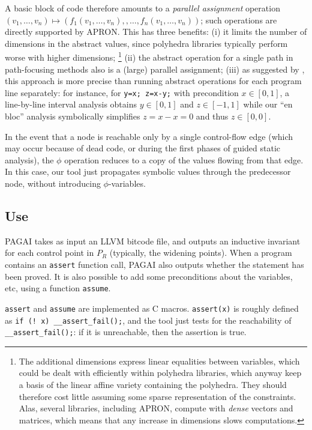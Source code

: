 \documentclass{entcs}
\begin{document}
A basic block of code therefore amounts to a \emph{parallel assignment} operation
$(v_1,\dots,v_n) \allowbreak\mapsto\allowbreak
(f_1(v_1,\dots,v_n), \allowbreak, \dots, \allowbreak
 f_n(v_1,\dots,v_n))$;
such operations are directly supported by APRON. This has three benefits:
(i) it limits the number of dimensions in the abstract values, since polyhedra libraries typically perform worse with higher dimensions;%
\footnote{The additional dimensions express linear equalities between variables, which could be dealt with efficiently within polyhedra libraries, which anyway keep a basis of the linear affine variety containing the polyhedra.
They should therefore cost little assuming some sparse representation of the constraints.
Alas, several libraries, including APRON, compute with \emph{dense} vectors and matrices, which means that any increase in dimensions slows computations.}
(ii) the abstract operation for a single path in path-focusing methods also is a (large) parallel assignment;
(iii) as suggested by \citet{DBLP:conf/vmcai/Mine06}, this approach is more precise than running abstract operations for each program line separately:
for instance, for \lstinline|y=x; z=x-y;| with precondition $x \in [0,1]$, a line-by-line interval analysis obtains $y \in [0,1]$ and $z \in [-1,1]$ while our ``en bloc'' analysis symbolically simplifies $z = x - x = 0$ and thus $z \in [0,0]$.

In the event that a node is reachable only by a single control-flow edge (which may occur because of dead code, or during the first phases of guided static analysis), the $\phi$ operation reduces to a copy of the values flowing from that edge. In this case, our tool just propagates symbolic values through the predecessor node, without introducing $\phi$-variables.


\subsection{Use}

PAGAI takes as input an LLVM bitcode file, and outputs an inductive invariant
for each control point in $P_R$ (typically, the widening points).
When a program contains an \lstinline|assert| function call, PAGAI also outputs whether
the statement has been proved.
It is also possible to add some preconditions about the variables, etc, using a
function \lstinline|assume|.

\lstinline|assert| and \lstinline|assume| are implemented as C macros. \lstinline|assert(x)| is roughly defined as \lstinline|if (! x) __assert_fail();|, and the tool just tests for the reachability of \lstinline|__assert_fail();|: if it is unreachable, then the assertion is true.
\end{document}
